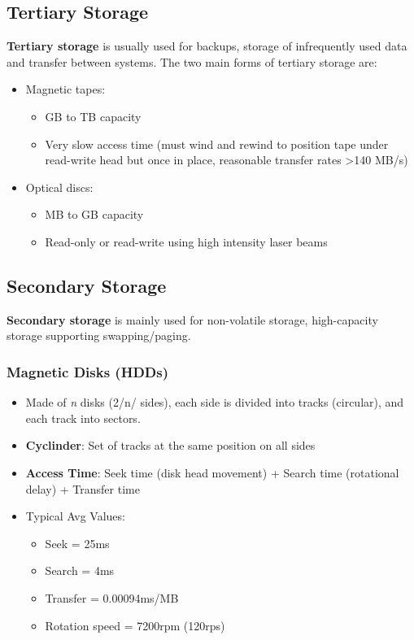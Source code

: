 \documentclass[11pt]{article}
\begin{document}
\subsection{Tertiary Storage}
\label{sec:org5e9bb57}
\textbf{Tertiary storage} is usually used for backups, storage of infrequently used data and transfer between systems.
The two main forms of tertiary storage are:
\begin{itemize}
\item Magnetic tapes:
\begin{itemize}
\item GB to TB capacity
\item Very slow access time (must wind and rewind to position tape under read-write head but once in place, reasonable transfer rates >140 MB/s)
\end{itemize}
\item Optical discs:
\begin{itemize}
\item MB to GB capacity
\item Read-only or read-write using high intensity laser beams
\end{itemize}
\end{itemize}
\subsection{Secondary Storage}
\label{sec:orgb0ff567}
\textbf{Secondary storage} is mainly used for non-volatile storage, high-capacity storage supporting swapping/paging.
\subsubsection{Magnetic Disks (HDDs)}
\label{sec:orgb2f056c}
\begin{itemize}
\item Made of \emph{n} disks (2/n/ sides), each side is divided into tracks (circular), and each track into sectors.
\item \textbf{Cyclinder}: Set of tracks at the same position on all sides
\item \textbf{Access Time}: Seek time (disk head movement) + Search time (rotational delay) + Transfer time
\item Typical Avg Values: 
\begin{itemize}
\item Seek = 25ms
\item Search = 4ms
\item Transfer = 0.00094ms/MB
\item Rotation speed = 7200rpm (120rps)
\end{itemize}
\end{itemize}
\end{document}

